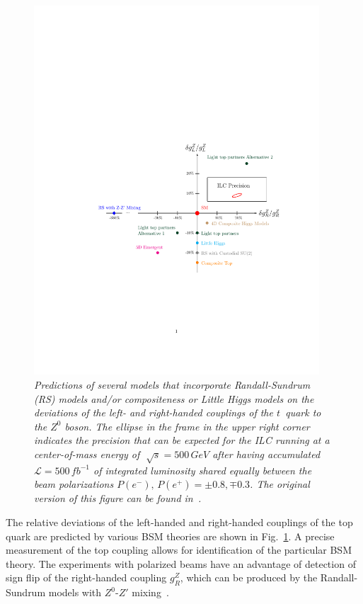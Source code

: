 \begin{figure}[h]
	{\centering
		\includegraphics[clip, trim=4cm 7cm 2cm 10cm, width=0.95\textwidth]{ILD/graphics/plot.pdf}
		\caption{\sl Predictions of several models that incorporate Randall-Sundrum (RS) models and/or compositeness or Little Higgs models on the deviations of the left- and right-handed couplings of the $t$~quark to the $Z^0$ boson. The ellipse in the frame in the upper right corner indicates the precision that can be expected for the ILC running at a center-of-mass energy of $\sqrt[]{s} = 500\,GeV$ after having accumulated ${\mathcal L}=500\,fb^{-1}$ of integrated luminosity shared equally between the beam polarizations $P(e^-),\,P(e^+) =\pm0.8,\mp0.3$. The original version of this figure can be found in~\cite{bib:ILCTOP}.}
		\label{fig:DeviationsTop}
	}
\end{figure}

The relative deviations of the left-handed and right-handed couplings of the top quark are predicted by various BSM theories are shown in Fig.~\ref{fig:DeviationsTop}.
A precise measurement of the top coupling allows for identification of the particular BSM theory.  
The experiments with polarized beams have an advantage of detection of sign flip of the right-handed coupling $g_R^Z$, which can be produced by the Randall-Sundrum models with $Z^0$-$Z'$ mixing~\cite{bib:RSTOP}.
%


